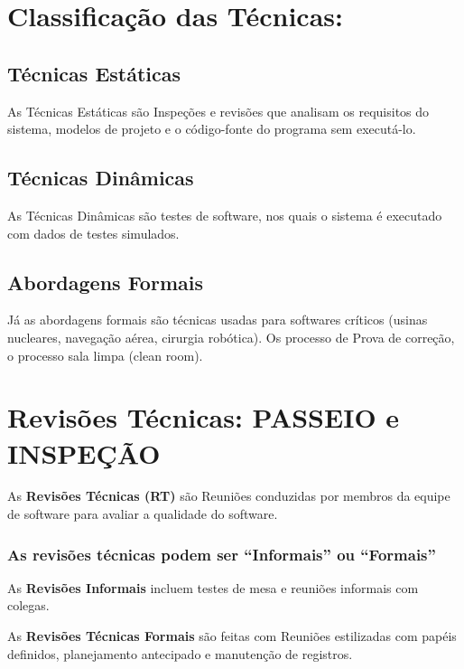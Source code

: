 \documentclass[
]{book}
\begin{document}
\section{Classificação das Técnicas:}\label{classificauxe7uxe3o-das-tuxe9cnicas}

\subsection{Técnicas Estáticas}\label{tuxe9cnicas-estuxe1ticas}

As Técnicas Estáticas são Inspeções e revisões que analisam os requisitos do sistema, modelos de projeto e o código-fonte do programa sem executá-lo.

\subsection{Técnicas Dinâmicas}\label{tuxe9cnicas-dinuxe2micas}

As Técnicas Dinâmicas são testes de software, nos quais o sistema é executado com dados de testes simulados.

\subsection{Abordagens Formais}\label{abordagens-formais}

Já as abordagens formais são técnicas usadas para softwares críticos (usinas nucleares, navegação aérea, cirurgia robótica). Os processo de Prova de correção, o processo sala limpa (clean room).

\section{Revisões Técnicas: PASSEIO e INSPEÇÃO}\label{revisuxf5es-tuxe9cnicas-passeio-e-inspeuxe7uxe3o}

As \textbf{Revisões Técnicas (RT)} são Reuniões conduzidas por membros da equipe de software para avaliar a qualidade do software.

\subsubsection{As revisões técnicas podem ser ``Informais'' ou ``Formais''}\label{as-revisuxf5es-tuxe9cnicas-podem-ser-informais-ou-formais}

As \textbf{Revisões Informais} incluem testes de mesa e reuniões informais com colegas.

As \textbf{Revisões Técnicas Formais} são feitas com Reuniões estilizadas com papéis definidos, planejamento antecipado e manutenção de registros.
\end{document}
